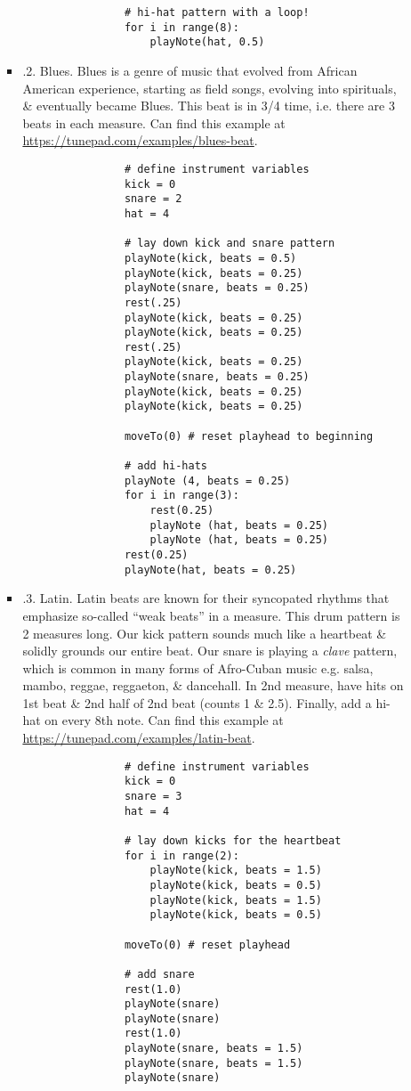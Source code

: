 \documentclass{article}
\begin{document}
\begin{itemize}
\begin{itemize}
\begin{itemize}
\begin{verbatim}
				# hi-hat pattern with a loop!
				for i in range(8):
				    playNote(hat, 0.5)
			\end{verbatim}
			\item {.2. Blues.} Blues is a genre of music that evolved from African American experience, starting as field songs, evolving into spirituals, \& eventually became Blues. This beat is in 3/4 time, i.e. there are 3 beats in each measure. Can find this example at \url{https://tunepad.com/examples/blues-beat}.
			\begin{verbatim}
				# define instrument variables
				kick = 0
				snare = 2
				hat = 4
				
				# lay down kick and snare pattern
				playNote(kick, beats = 0.5)
				playNote(kick, beats = 0.25)
				playNote(snare, beats = 0.25)
				rest(.25)
				playNote(kick, beats = 0.25)
				playNote(kick, beats = 0.25)
				rest(.25)
				playNote(kick, beats = 0.25)
				playNote(snare, beats = 0.25)
				playNote(kick, beats = 0.25)
				playNote(kick, beats = 0.25)
				
				moveTo(0) # reset playhead to beginning
				
				# add hi-hats
				playNote (4, beats = 0.25)
				for i in range(3):
				    rest(0.25)
				    playNote (hat, beats = 0.25)
				    playNote (hat, beats = 0.25)
				rest(0.25)
				playNote(hat, beats = 0.25)
			\end{verbatim}
			\item {.3. Latin.} Latin beats are known for their syncopated rhythms that emphasize so-called ``weak beats'' in a measure. This drum pattern is 2 measures long. Our kick pattern sounds much like a heartbeat \& solidly grounds our entire beat. Our snare is playing a {\it clave} pattern, which is common in many forms of Afro-Cuban music e.g. salsa, mambo, reggae, reggaeton, \& dancehall. In 2nd measure, have hits on 1st beat \& 2nd half of 2nd beat (counts 1 \& 2.5). Finally, add a hi-hat on every 8th note. Can find this example at \url{https://tunepad.com/examples/latin-beat}.
			\begin{verbatim}
				# define instrument variables
				kick = 0
				snare = 3
				hat = 4
				
				# lay down kicks for the heartbeat
				for i in range(2):
				    playNote(kick, beats = 1.5)
				    playNote(kick, beats = 0.5)
				    playNote(kick, beats = 1.5)
				    playNote(kick, beats = 0.5)
				    
				moveTo(0) # reset playhead
				
				# add snare
				rest(1.0)
				playNote(snare)
				playNote(snare)
				rest(1.0)
				playNote(snare, beats = 1.5)
				playNote(snare, beats = 1.5)
				playNote(snare)
				

\end{verbatim}
\end{itemize}
\end{itemize}
\end{itemize}
\end{document}
